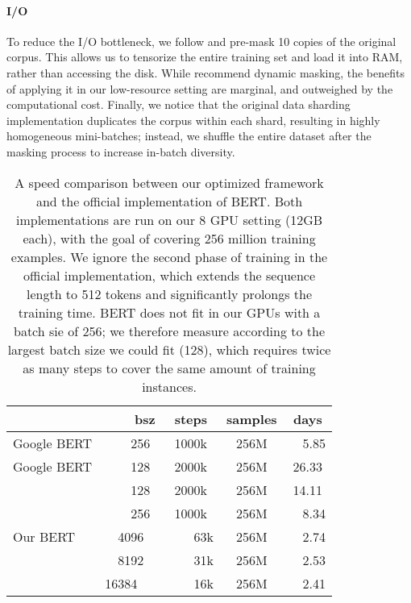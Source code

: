 \documentclass[11pt]{article}
\newcommand{\bertbase}{BERT }
\newcommand{\bertlarge}{BERT }
\begin{document}
\paragraph{I/O}
To reduce the I/O bottleneck, we follow \citet{devlin-etal-2019-bert} and pre-mask 10 copies of the original corpus.
This allows us to tensorize the entire training set and load it into RAM, rather than accessing the disk.
While \citet{Liu2019RoBERTaAR} recommend dynamic masking, the benefits of applying it in our low-resource setting are marginal, and outweighed by the computational cost.
Finally, we notice that the original data sharding implementation duplicates the corpus within each shard, resulting in highly homogeneous mini-batches; instead, we shuffle the entire dataset after the masking process to increase in-batch diversity.

\begin{table}
\centering
\small
\begin{tabular}{@{}llccc@{}}
\toprule
 & \textbf{~~~~bsz} & \textbf{steps} & \textbf{samples} & \textbf{days} \\ \midrule
Google \bertbase                   & ~~~~256   & 1000k    & 256M  & ~~5.85  \\ 
Google \bertlarge        & ~~~~128    & 2000k    & 256M   & 26.33 \\ \midrule 
\multirow{5}{*}{Our \bertlarge{}}    & ~~~~128   & 2000k    & 256M     & 14.11 \\
    & ~~~~256   & 1000k    & 256M     & ~~8.34 \\
    & ~~4096     & ~~~~63k & 256M    & ~~2.74 \\
    & ~~8192     & ~~~~31k & 256M     & ~~2.53 \\
    & 16384      & ~~~~16k & 256M & ~~2.41   \\ \bottomrule
\end{tabular}
\caption{A speed comparison between our optimized framework and the official implementation of BERT. 
Both implementations are run on our 8 GPU setting (12GB each), with the goal of covering 256 million training examples.
We ignore the second phase of training in the official implementation, which extends the sequence length to 512 tokens and significantly prolongs the training time.
\bertlarge does not fit in our GPUs with a batch sie of 256; we therefore measure according to the largest batch size we could fit (128), which requires twice as many steps to cover the same amount of training instances.
}
\label{tab:backend}
\end{table}
\end{document}
